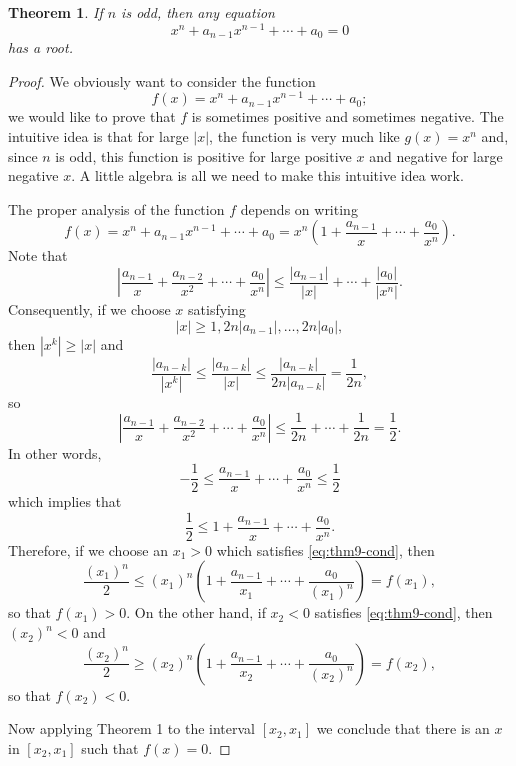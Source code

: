 \documentclass{article}
\newtheorem{theorem}{Theorem}
\begin{document}
\begin{theorem}
  If $n$ is odd, then any equation \[
    x^n + a_{n-1}x^{n-1} + \cdots + a_0 = 0
  \] has a root.
\end{theorem}
\begin{proof}
  We obviously want to consider the function \[
    f(x) = x^n + a_{n-1}x^{n-1} + \cdots + a_0;
  \] we would like to prove that $f$ is sometimes positive and sometimes
  negative. The intuitive idea is that for large $|x|$, the function is very
  much like $g(x) = x^n$ and, since $n$ is odd, this function is positive for
  large positive $x$ and negative for large negative $x$. A little algebra is
  all we need to make this intuitive idea work.

  The proper analysis of the function $f$ depends on writing \[
    f(x) = x^n + a_{n-1}x^{n-1} + \cdots + a_0
    = x^n \left( 1 + \frac{a_{n-1}}{x} + \cdots + \frac{a_0}{x^n} \right).
  \] Note that \[
    \left| \frac{a_{n-1}}{x} + \frac{a_{n-2}}{x^2} + \cdots + \frac{a_0}{x^n}
      \right| \leq \frac{|a_{n-1}|}{|x|} + \cdots + \frac{|a_0|}{|x^n|}.
  \] Consequently, if we choose $x$ satisfying \[
    \label{eq:thm9-cond} \tag{*}
    |x| \geq 1, 2n|a_{n-1}|, \ldots, 2n|a_0|,
  \] then $|x^k| \geq |x|$ and \[
    \frac{|a_{n-k}|}{|x^k|} \leq \frac{|a_{n-k}|}{|x|}
    \leq \frac{|a_{n-k}|}{2n |a_{n-k}|}
    = \frac{1}{2n},
  \] so \[
    \left| \frac{a_{n-1}}{x} + \frac{a_{n-2}}{x^2} + \cdots + \frac{a_0}{x^n}
      \right| \leq \frac{1}{2n} + \cdots + \frac{1}{2n} = \frac{1}{2}.
  \] In other words, \[
    -\frac{1}{2} \leq \frac{a_{n-1}}{x} + \cdots + \frac{a_0}{x^n} \leq
      \frac{1}{2}
  \] which implies that \[
    \frac{1}{2} \leq 1 + \frac{a_{n-1}}{x} + \cdots + \frac{a_0}{x^n}.
  \] Therefore, if we choose an $x_1 > 0$ which satisfies \eqref{eq:thm9-cond},
  then \[
    \frac{(x_1)^n}{2}
    \leq (x_1)^n \left( 1 + \frac{a_{n-1}}{x_1} + \cdots + \frac{a_0}{(x_1)^n}
    \right)
    = f(x_1),
  \] so that $f(x_1) > 0$. On the other hand, if $x_2 < 0$ satisfies
  \eqref{eq:thm9-cond}, then $(x_2)^n < 0$ and \[
    \frac{(x_2)^n}{2}
    \geq (x_2)^n \left( 1 + \frac{a_{n-1}}{x_2} + \cdots + \frac{a_0}{(x_2)^n}
    \right)
    = f(x_2),
  \] so that $f(x_2) < 0$.

  Now applying Theorem 1 to the interval $[x_2, x_1]$ we conclude that there is
  an $x$ in $[x_2, x_1]$ such that $f(x) = 0$.
\end{proof}
\end{document}
